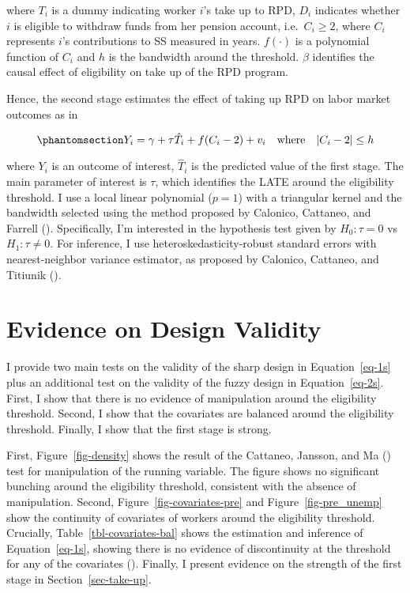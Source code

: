 \documentclass[
  4pt,
]{report}
\begin{document}
where \(T_{i}\) is a dummy indicating worker \(i\)'s take up to RPD,
\(D_i\) indicates whether \(i\) is eligible to withdraw funds from her
pension account, i.e.~\(C_i \ge 2\), where \(C_i\) represents \(i\)'s
contributions to SS measured in years. \(f(\cdot)\) is a polynomial
function of \(C_i\) and \(h\) is the bandwidth around the threshold.
\(\beta\) identifies the causal effect of eligibility on take up of the
RPD program.

Hence, the second stage estimates the effect of taking up RPD on labor
market outcomes as in

\begin{equation}\phantomsection\label{eq-2s}{
Y_i = \gamma + \tau \hat T_i + f(C_i - 2) + v_i \quad \text{where} \quad |C_i - 2| \le h
}\end{equation}

where \(Y_{i}\) is an outcome of interest, \(\hat T_i\) is the predicted
value of the first stage. The main parameter of interest is \(\tau\),
which identifies the LATE around the eligibility threshold. I use a
local linear polynomial (\(p=1\)) with a triangular kernel and the
bandwidth selected using the method proposed by Calonico, Cattaneo, and
Farrell (). Specifically, I'm
interested in the hypothesis test given by \(H_0: \tau=0\) vs
\(H_1: \tau \ne 0\). For inference, I use heteroskedasticity-robust
standard errors with nearest-neighbor variance estimator, as proposed by
Calonico, Cattaneo, and Titiunik ().

\section{Evidence on Design Validity}\label{sec-assumptions}

I provide two main tests on the validity of the sharp design in
Equation~\ref{eq-1s} plus an additional test on the validity of the
fuzzy design in Equation~\ref{eq-2s}. First, I show that there is no
evidence of manipulation around the eligibility threshold. Second, I
show that the covariates are balanced around the eligibility threshold.
Finally, I show that the first stage is strong.

First, Figure~\ref{fig-density} shows the result of the Cattaneo,
Jansson, and Ma () test for
manipulation of the running variable. The figure shows no significant
bunching around the eligibility threshold, consistent with the absence
of manipulation. Second, Figure~\ref{fig-covariates-pre} and
Figure~\ref{fig-pre_unemp} show the continuity of covariates of workers
around the eligibility threshold. Crucially,
Table~\ref{tbl-covariates-bal} shows the estimation and inference of
Equation~\ref{eq-1s}, showing there is no evidence of discontinuity at
the threshold for any of the covariates
().
Finally, I present evidence on the strength of the first stage in
Section~\ref{sec-take-up}.
\end{document}
